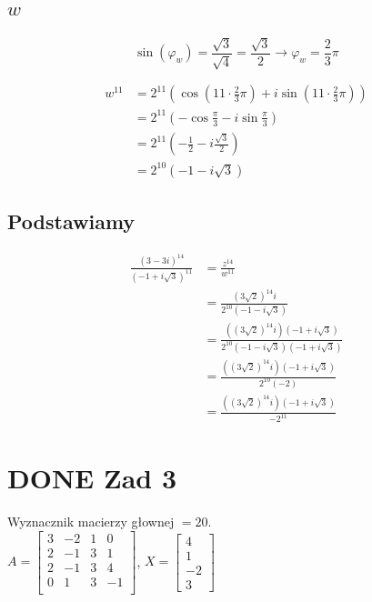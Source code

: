 \documentclass[11pt]{article}
\begin{document}
\subsection{\(w\)}
\label{sec:orgc69e61f}
$$\sin(\varphi_w) = \frac{\sqrt{3}}{\sqrt{4}} = \frac{\sqrt{3}}{2}
\to \varphi_w = \frac{2}{3} \pi$$

\begin{align*}
w^{11} &= 2^{11} \left( \cos \left(11 \cdot \frac{2}{3} \pi \right)
+ i \sin \left( 11 \cdot \frac{2}{3} \pi \right) \right)\\
&= 2^{11} \left( -\cos \frac{\pi}{3}
- i \sin \frac{\pi}{3} \right)\\
&= 2^{11} \left(- \frac{1}{2} - i \frac{\sqrt{3}}{2} \right)\\
&= 2^{10} \left(-1 - i \sqrt{3} \right)
\end{align*}
\subsection{Podstawiamy}
\label{sec:orgb39d53b}
\begin{align*}
\frac{ { (3 - 3i)}^{14} }
{ { (-1+i\sqrt{3}) }^{11} }
&= \frac{z^{14}}{w^{11}}\\
&=\frac{(3\sqrt{2})^{14} i }
{2^{10}(-1 -i\sqrt{3})}\\
&=\frac{ ((3\sqrt{2})^{14} i)(-1 + i\sqrt{3}) }
{2^{10}(-1 -i\sqrt{3})(-1 + i\sqrt{3})}\\
&=\frac{ ((3\sqrt{2})^{14} i)(-1 + i\sqrt{3}) }
{2^{10}(-2)}\\
&=\frac{ ((3\sqrt{2})^{14} i)(-1 + i\sqrt{3}) }
{-2^{11}}
\end{align*}
\section{{\bfseries\sffamily DONE} Zad 3}
\label{sec:org2064f70}
Wyznacznik macierzy głownej \(= 20\).
\\\empty
\(A = \begin{bmatrix}
3  & -2 & 1 & 0 \\
2  & -1 & 3 & 1 \\
2 & -1 & 3 & 4 \\
0 & 1 & 3 & -1 \\
\end{bmatrix}\),
\(X = \begin{bmatrix}
4\\
1\\
-2\\
3
\end{bmatrix}\)
\end{document}
